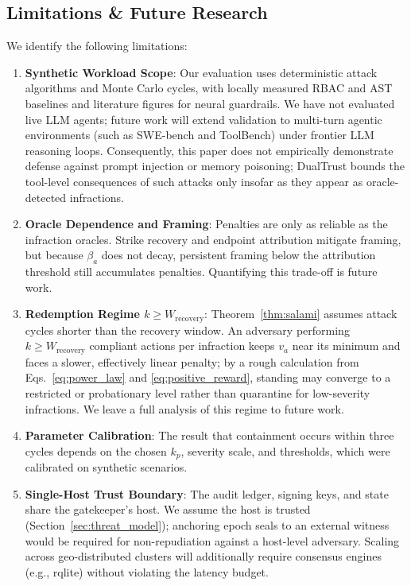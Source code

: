 \documentclass[manuscript, screen, review]{jair}
\begin{document}
\subsection{Limitations \& Future Research}
We identify the following limitations:
\begin{enumerate}[leftmargin=12pt, topsep=2pt, itemsep=1pt]
\item \textbf{Synthetic Workload Scope}: Our evaluation uses deterministic attack algorithms and Monte Carlo cycles, with locally measured RBAC and AST baselines and literature figures for neural guardrails. We have not evaluated live LLM agents; future work will extend validation to multi-turn agentic environments (such as SWE-bench and ToolBench) under frontier LLM reasoning loops. Consequently, this paper does not empirically demonstrate defense against prompt injection or memory poisoning; DualTrust bounds the tool-level consequences of such attacks only insofar as they appear as oracle-detected infractions.
\item \textbf{Oracle Dependence and Framing}: Penalties are only as reliable as the infraction oracles. Strike recovery and endpoint attribution mitigate framing, but because $\beta_a$ does not decay, persistent framing below the attribution threshold still accumulates penalties. Quantifying this trade-off is future work.
\item \textbf{Redemption Regime $k \ge W_{\text{recovery}}$}: Theorem~\ref{thm:salami} assumes attack cycles shorter than the recovery window. An adversary performing $k \ge W_{\text{recovery}}$ compliant actions per infraction keeps $v_a$ near its minimum and faces a slower, effectively linear penalty; by a rough calculation from Eqs.~\eqref{eq:power_law} and \eqref{eq:positive_reward}, standing may converge to a restricted or probationary level rather than quarantine for low-severity infractions. We leave a full analysis of this regime to future work.
\item \textbf{Parameter Calibration}: The result that containment occurs within three cycles depends on the chosen $k_p$, severity scale, and thresholds, which were calibrated on synthetic scenarios.
\item \textbf{Single-Host Trust Boundary}: The audit ledger, signing keys, and state share the gatekeeper's host. We assume the host is trusted (Section~\ref{sec:threat_model}); anchoring epoch seals to an external witness would be required for non-repudiation against a host-level adversary. Scaling across geo-distributed clusters will additionally require consensus engines (e.g., rqlite) without violating the latency budget.

\end{enumerate}
\end{document}
